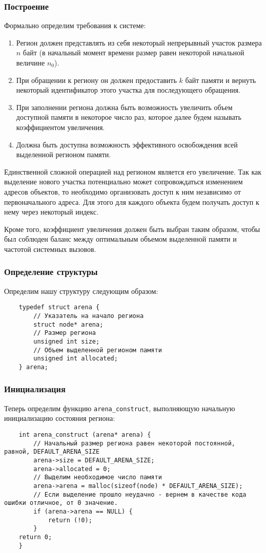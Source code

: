 \subsubsection{Построение}
Формально определим требования к системе:
\begin{enumerate}
    \item Регион должен представлять из себя некоторый непрерывный участок 
    размера $n$ байт (в начальный момент времени размер равен некоторой 
    начальной величине $n_0$).
    \item При обращении к региону он должен предоставить $k$ байт памяти и 
    вернуть некоторый идентификатор этого участка для последующего обращения.
    \item При заполнении региона должна быть возможность увеличить объем 
    доступной памяти в некоторое число раз, которое далее будем называть
    коэффициентом увеличения.
    \item Должна быть доступна возможность эффективного освобождения всей 
    выделенной регионом памяти.
\end{enumerate}

Единственной сложной операцией над регионом является его увеличение.
Так как выделение нового участка потенциально может сопровождаться изменением 
адресов объектов, то необходимо организовать доступ к ним независимо от 
первоначального адреса. Для этого для каждого объекта будем получать доступ к 
нему через некоторый индекс. 

Кроме того, коэффициент увеличения должен быть выбран таким образом, чтобы был 
соблюден баланс между оптимальным объемом выделенной памяти и частотой системных
вызовов.

\subsubsection{Определение структуры}
Определим нашу структуру следующим образом:
\begin{verbatim}
    typedef struct arena {
        // Указатель на начало региона
        struct node* arena;
        // Размер региона
        unsigned int size;
        // Объем выделенной регионом памяти
        unsigned int allocated;
    } arena;
\end{verbatim}

\subsubsection{Инициализация}
Теперь определим функцию \verb|arena_construct|, выполняющую начальную 
инициализацию состояния региона:
\begin{verbatim}
    int arena_construct (arena* arena) {
        // Начальный размер региона равен некоторой постоянной, равной, DEFAULT_ARENA_SIZE
        arena->size = DEFAULT_ARENA_SIZE;
        arena->allocated = 0;
        // Выделим необходимое число памяти
        arena->arena = malloc(sizeof(node) * DEFAULT_ARENA_SIZE);
        // Если выделение прошло неудачно - вернем в качестве кода ошибки отличное, от 0 значение.
        if (arena->arena == NULL) {
            return (!0);
        }
    return 0;
    }
\end{verbatim}

